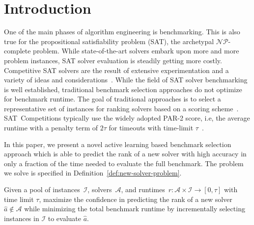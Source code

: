 \documentclass[runningheads]{llncs}
\begin{document}
\section{Introduction}
\label{sec:intro}
One of the main phases of algorithm engineering is benchmarking.
This is also true for the pro\-po\-si\-tio\-nal sat\-is\-fia\-bi\-li\-ty problem (SAT), the archetypal $\mathcal{NP}$-complete problem.
While state-of-the-art solvers embark upon more and more problem instances, SAT solver evaluation is steadily getting more costly.
Competitive SAT solvers are the result of extensive experimentation and a variety of ideas and considerations~\cite{FroleyksHIJS21,sat2022}.
While the field of SAT solver benchmarking is well established, traditional benchmark selection approaches do not optimize for benchmark runtime.
The goal of traditional approaches is to select a representative set of instances for ranking solvers based on a scoring scheme~\cite{Gelder11,HoosKSS13}.
SAT~Competitions typically use the widely adopted PAR-2 score, i.e, the average runtime with a penalty term of $2 \tau$ for timeouts with time-limit $\tau$~\cite{FroleyksHIJS21}.

In this paper, we present a novel active learning based benchmark selection approach which is able to predict the rank of a new solver with high accuracy in only a fraction of the time needed to evaluate the full benchmark.
The problem we solve is specified in Definition~\ref{def:new-solver-problem}.

\begin{definition}
	Given a pool of instances~$\mathcal{I}$, solvers~$\mathcal{A}$, and runtimes~$r\!: \mathcal{A} \times \mathcal{I} \rightarrow \left[0, \tau\right]$ with time limit $\tau$, maximize the confidence in predicting the rank of a new solver $\hat{a} \notin \mathcal{A}$ while minimizing the total benchmark runtime by incrementally selecting instances in $\mathcal{I}$ to evaluate $\hat{a}$.
	\label{def:new-solver-problem}
\end{definition}



\end{document}
